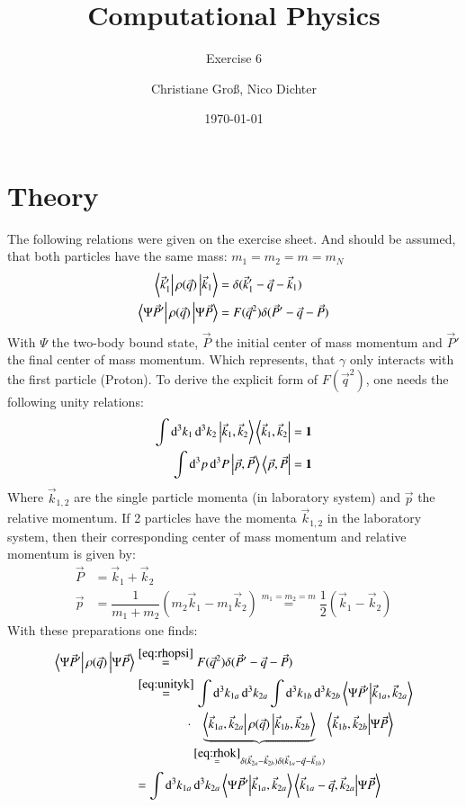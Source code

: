 \documentclass{scrartcl}
\title{Computational Physics}
\subtitle{Exercise 6}
\date{\today}
\author{Christiane Groß, Nico Dichter}
\begin{document}
	\maketitle
	
\section{Theory}
The following relations were given on the exercise sheet. And should be assumed, that both particles have the same mass: $m_1=m_2=m=m_N$
\begin{align}
	\bra{\vec{k}_1'}\rho(\vec{q})\ket{\vec{k}_1}&=\delta(\vec{k}_1'-\vec{q}-\vec{k}_1)\label{eq:rhok}\\
	\bra{\Psi \vec{P}'}\rho(\vec{q})\ket{\Psi\vec{P}}&=F(\vec{q}^2)\delta(\vec{P}'-\vec{q}-\vec{P})\label{eq:rhopsi}
\end{align}
With $\Psi$ the two-body bound state, $\vec{P}$ the initial center of mass momentum and $\vec{P}'$ the final center of mass momentum. Which represents, that $\gamma$ only interacts with the first particle (Proton). To derive the explicit form of $F(\vec{q}^2)$, one needs the following unity relations:
\begin{align}
	\int\dd[3]{k_1}\dd[3]{k_2}\ket{\vec{k}_1,\vec{k}_2}\bra{\vec{k}_1,\vec{k}_2}&=\mathbf{1}\label{eq:unityk}\\
	\int\dd[3]{p}\dd[3]{P}\ket{\vec{p},\vec{P}}\bra{\vec{p},\vec{P}}&=\mathbf{1}\label{eq:unityp}
\end{align}
Where $\vec{k}_{1,2}$ are the single particle momenta (in laboratory system) and $\vec{p}$ the relative momentum. If 2 particles have the momenta $\vec{k}_{1,2}$ in the laboratory system, then their corresponding center of mass momentum and relative momentum is given by:
\begin{align}
	\vec{P}&=\vec{k}_1+\vec{k}_2\label{eq:pk}\\
	\vec{p}&=\dfrac{1}{m_1+m_2}(m_2\vec{k}_1-m_1\vec{k}_2)\overset{m_1=m_2=m}{=}\dfrac{1}{2}(\vec{k}_1-\vec{k}_2)\label{eq:pmk}
\end{align}
With these preparations one finds:
\begin{align}
	\bra{\Psi \vec{P}'}\rho(\vec{q})\ket{\Psi\vec{P}}&\overset{\ref{eq:rhopsi}}{=}F(\vec{q}^2)\delta(\vec{P}'-\vec{q}-\vec{P})\\
	&\overset{\ref{eq:unityk}}{=}\int\dd[3]{k_{1a}}\dd[3]{k_{2a}}\int\dd[3]{k_{1b}}\dd[3]{k_{2b}}\bra{\Psi \vec{P}'}\ket{\vec{k}_{1a},\vec{k}_{2a}}\\&\qquad\qquad\cdot\underbrace{\bra{\vec{k}_{1a},\vec{k}_{2a}}\rho(\vec{q})\ket{\vec{k}_{1b},\vec{k}_{2b}}}_{\substack{\overset{\ref{eq:rhok}}{=}\delta(\vec{k}_{2a}-\vec{k}_{2b})\delta(\vec{k}_{1a}-\vec{q}-\vec{k}_{1b})}}\bra{\vec{k}_{1b},\vec{k}_{2b}}\ket{\Psi\vec{P}}\\
	&=\int\dd[3]{k_{1a}}\dd[3]{k_{2a}}\bra{\Psi \vec{P}'}\ket{\vec{k}_{1a},\vec{k}_{2a}}\bra{\vec{k}_{1a}-\vec{q},\vec{k}_{2a}}\ket{\Psi\vec{P}}
\end{align}
\end{document}
